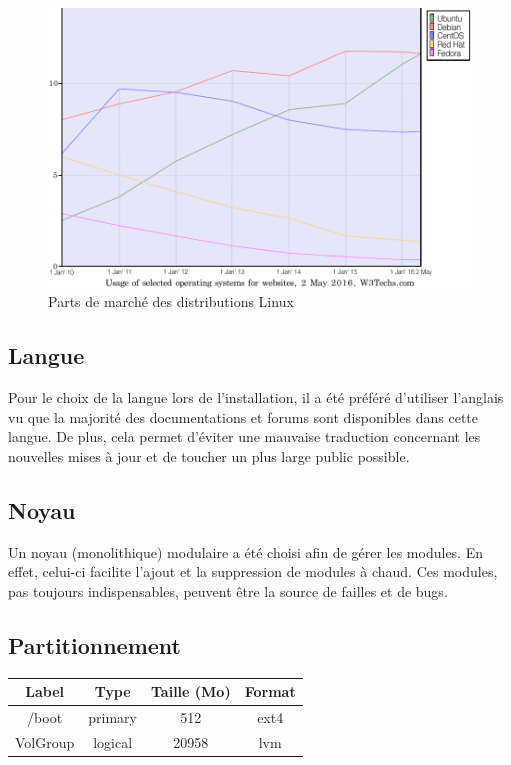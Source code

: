 \begin{figure}[h]
  \centering
  \includegraphics[scale=0.65]
  {textures/images/installation/distributions.pdf}
  \caption{Parts de marché des distributions Linux}
\end{figure}

\newpage

\subsection{Langue}
\label{sec:langue}

Pour le choix de la langue lors de l'installation, il a été préféré d'utiliser
l'anglais vu que la majorité des documentations et forums sont disponibles dans
cette langue. De plus, cela permet d'éviter une mauvaise traduction concernant
les nouvelles mises à jour et de toucher un plus large public possible.

\subsection{Noyau}
\label{sec:noyau}

Un noyau (monolithique) modulaire a été choisi afin de gérer les
modules. En effet, celui-ci facilite l'ajout et la suppression de modules à
chaud. Ces modules, pas toujours indispensables, peuvent être la source de
failles et de bugs.

\subsection{Partitionnement}
\label{sec:partitionnement}

\begin{center}
  \begin{tabularx}{\linewidth}{|C|C|C|C|}
    \hline
    Label & Type & Taille (Mo) & Format \\
    \hline
    \hline
    /boot & primary & 512 & ext4 \\
    \hline
    VolGroup & logical & 20958 & lvm \\
    \hline
  \end{tabularx}
\end{center}

